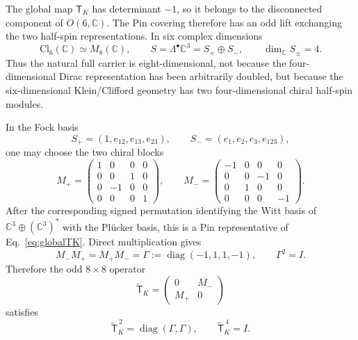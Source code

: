 \documentclass[11pt]{article}
\theoremstyle{definition}\newtheorem{definition}[theorem]{Definition}
\theoremstyle{remark}\newtheorem{remark}[theorem]{Remark}\newtheorem{conjecture}[theorem]{Conjecture}
\begin{document}
The global map $\mathsf T_K$ has determinant $-1$, so it belongs to the disconnected component of $O(6,\mathbb C)$. The Pin covering therefore has an odd lift exchanging the two half-spin representations. In six complex dimensions
\begin{equation}\label{eq:cl6spin}
 \mathrm{Cl}_6(\mathbb C)\simeq M_8(\mathbb C),\qquad
 S=\Lambda^\bullet\mathbb C^3=S_+\oplus S_-,
 \qquad
 \dim_\mathbb C S_\pm=4.
\end{equation}
Thus the natural full carrier is eight-dimensional, not because the four-dimensional Dirac representation has been arbitrarily doubled, but because the six-dimensional Klein/Clifford geometry has two four-dimensional chiral half-spin modules.

In the Fock basis
\begin{equation}
 S_+=(1,e_{12},e_{13},e_{23}),\qquad
 S_-=(e_1,e_2,e_3,e_{123}),
\end{equation}
one may choose the two chiral blocks
\begin{equation}\label{eq:pinblocks}
 M_+=
 \begin{pmatrix}
 1&0&0&0\\
 0&0&1&0\\
 0&-1&0&0\\
 0&0&0&1
 \end{pmatrix},
 \qquad
 M_-=
 \begin{pmatrix}
 -1&0&0&0\\
 0&0&-1&0\\
 0&1&0&0\\
 0&0&0&-1
 \end{pmatrix}.
\end{equation}
After the corresponding signed permutation identifying the Witt basis of
$\mathbb C^3\oplus(\mathbb C^3)^*$ with the Pl\"ucker basis, this is a Pin representative of Eq.~\eqref{eq:globalTK}. Direct multiplication gives
\begin{equation}\label{eq:pinsquare}
 M_-M_+=M_+M_-=
 \Gamma:=\operatorname{diag}(-1,1,1,-1),
 \qquad \Gamma^2=I.
\end{equation}
Therefore the odd $8\times8$ operator
\begin{equation}
 \widetilde{\mathsf T}_K=
 \begin{pmatrix}0&M_-\\M_+&0\end{pmatrix}
\end{equation}
satisfies
\begin{equation}\label{eq:pinorder4}
 \boxed{\widetilde{\mathsf T}_K^{\,2}
 =\operatorname{diag}(\Gamma,\Gamma),\qquad
 \widetilde{\mathsf T}_K^{\,4}=I.}
\end{equation}
\end{document}
